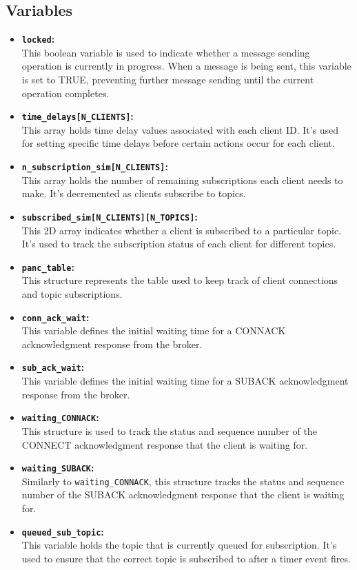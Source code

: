 \documentclass[11pt]{article}
\begin{document}
\subsection*{Variables}
\begin{itemize}
\item{\textbf{\texttt{locked}:}}\\
This boolean variable is used to indicate whether a message sending operation is currently in progress. When a message is being sent, this variable is set to TRUE, preventing further message sending until the current operation completes.
\item{\textbf{\texttt{time\_delays[N\_CLIENTS]}:}}\\
This array holds time delay values associated with each client ID. It's used for setting specific time delays before certain actions occur for each client.
\item{\textbf{\texttt{n\_subscription\_sim[N\_CLIENTS]}:}}\\
This array holds the number of remaining subscriptions each client needs to make. It's decremented as clients subscribe to topics.
\item{\textbf{\texttt{subscribed\_sim[N\_CLIENTS][N\_TOPICS]}:}}\\
This 2D array indicates whether a client is subscribed to a particular topic. It's used to track the subscription status of each client for different topics.
\item{\textbf{\texttt{panc\_table}:}}\\
This structure represents the table used to keep track of client connections and topic subscriptions.
\item{\textbf{\texttt{conn\_ack\_wait}:}}\\
This variable defines the initial waiting time for a CONNACK acknowledgment response from the broker. 
\item{\textbf{\texttt{sub\_ack\_wait}:}}\\
This variable defines the initial waiting time for a SUBACK acknowledgment response from the broker.
\item{\textbf{\texttt{waiting\_CONNACK}:}}\\
This structure is used to track the status and sequence number of the CONNECT acknowledgment response that the client is waiting for.
\item{\textbf{\texttt{waiting\_SUBACK}:}}\\
Similarly to \texttt{waiting\_CONNACK}, this structure tracks the status and sequence number of the SUBACK acknowledgment response that the client is waiting for.
\item{\textbf{\texttt{queued\_sub\_topic}:}}\\
This variable holds the topic that is currently queued for subscription. It's used to ensure that the correct topic is subscribed to after a timer event fires.

\end{itemize}
\end{document}
